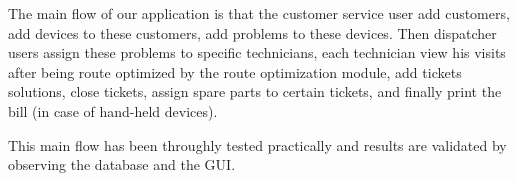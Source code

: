 The main flow of our application is that the customer service user add customers, add devices to these customers, add problems to these devices. Then dispatcher users assign these problems to specific technicians, each technician view his visits after being route optimized by the route optimization module, add tickets solutions, close tickets, assign spare parts to certain tickets, and finally print the bill (in case of hand-held devices).

This main flow has been throughly tested practically and results are validated by observing the database and the GUI.